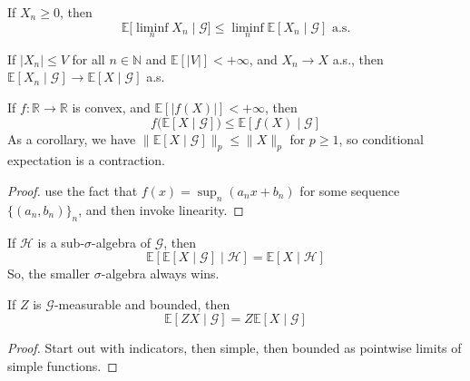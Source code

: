 	\begin{theorem}
	  If $X_n \geq 0$, then 
		\begin{equation}
			\mathbb{E}\big[ \liminf_n X_n \mid \mathscr{G} \big] \leq \liminf_n \mathbb{E}[X_n \mid \mathscr{G}] \text{ a.s.}
		\end{equation}
	\end{theorem}

	\begin{theorem}
		If $|X_n| \leq V$ for all $n \in \mathbb{N}$ and $\mathbb{E}[|V|] < +\infty$, and $X_n \to X$ a.s., then $\mathbb{E}[X_n \mid \mathscr{G}] \to \mathbb{E}[X \mid \mathscr{G}]$ a.s. 
	\end{theorem}

	\begin{theorem}
		If $f: \mathbb{R} \to \mathbb{R}$ is convex, and $\mathbb{E}[|f(X)|] < +\infty$, then 
		\begin{equation}
			f\big( \mathbb{E}[X \mid \mathscr{G}] \big) \leq \mathbb{E}[f(X) \mid \mathscr{G}]
		\end{equation}
		As a corollary, we have $\|\mathbb{E}[X \mid \mathscr{G}]\|_p \leq \|X\|_p$ for $p \geq 1$, so conditional expectation is a contraction. 
	\end{theorem}
	\begin{proof}
		use the fact that $f(x) = \sup_n (a_n x + b_n)$ for some sequence $\{(a_n, b_n)\}_n$, and then invoke linearity. 
	\end{proof}

	\begin{theorem}
	  If $\mathscr{H}$ is a sub-$\sigma$-algebra of $\mathscr{G}$, then 
		\begin{equation}
			\mathbb{E}[\mathbb{E}[X \mid \mathscr{G}] \mid \mathscr{H}] = \mathbb{E}[X \mid \mathscr{H}]
		\end{equation}
		So, the smaller $\sigma$-algebra always wins. 
	\end{theorem}

	\begin{theorem}
	  If $Z$ is $\mathscr{G}$-measurable and bounded, then 
		\begin{equation}
			\mathbb{E}[Z X \mid \mathscr{G}] = Z \mathbb{E}[X \mid \mathscr{G}]
		\end{equation}
	\end{theorem}
	\begin{proof}
	  Start out with indicators, then simple, then bounded as pointwise limits of simple functions. 
	\end{proof}

